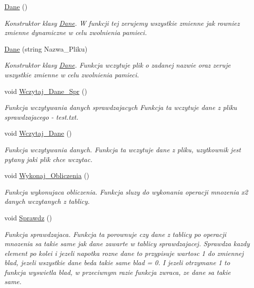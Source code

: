 \begin{DoxyCompactItemize}
\item 
\hyperlink{class_dane_a623e63e2c94f352a14758c8671f197d0}{\-Dane} ()
\begin{DoxyCompactList}\small\item\em \-Konstruktor klasy \hyperlink{class_dane}{\-Dane}. \-W funkcji tej zerujemy wszystkie zmienne jak rowniez zmienne dynamiczne w celu zwolnienia pamieci. \end{DoxyCompactList}\item 
\hyperlink{class_dane_ac5b1c1fcec846b36b7bd601e2358aef0}{\-Dane} (string \-Nazwa\-\_\-\-Pliku)
\begin{DoxyCompactList}\small\item\em \-Konstruktor klasy \hyperlink{class_dane}{\-Dane}. \-Funkcja wczytuje plik o zadanej nazwie oraz zeruje wszystkie zmienne w celu zwolnienia pamieci. \end{DoxyCompactList}\item 
void \hyperlink{class_dane_a83171250f88d38d2cbac97185b3bd5dd}{\-Wczytaj\-\_\-\-Dane\-\_\-\-Spr} ()
\begin{DoxyCompactList}\small\item\em \-Funkcja wczytywania danych sprawdzajacych \-Funkcja ta wczytuje dane z pliku sprawdzajacego -\/ test.\-txt. \end{DoxyCompactList}\item 
void \hyperlink{class_dane_ad992d9c799eb8e35bfb6069e0812b908}{\-Wczytaj\-\_\-\-Dane} ()
\begin{DoxyCompactList}\small\item\em \-Funkcja wczytywania danych. \-Funkcja ta wczytuje dane z pliku, uzytkownik jest pytany jaki plik chce wczytac. \end{DoxyCompactList}\item 
void \hyperlink{class_dane_a71e1e5ab35b8952f84724853c042e90b}{\-Wykonaj\-\_\-\-Obliczenia} ()
\begin{DoxyCompactList}\small\item\em \-Funkcja wykonujaca obliczenia. \-Funkcja sluzy do wykonania operacji mnozenia x2 danych wczytanych z tablicy. \end{DoxyCompactList}\item 
void \hyperlink{class_dane_a1dd37a4eb6da968da533e80f36145fdc}{\-Sprawdz} ()
\begin{DoxyCompactList}\small\item\em \-Funkcja sprawdzajaca. \-Funkcja ta porownuje czy dane z tablicy po operacji mnozenia sa takie same jak dane zawarte w tablicy sprawdzajacej. \-Sprawdza kazdy element po kolei i jezeli napotka rozne dane to przypisuje wartosc 1 do zmiennej blad, jezeli wszystkie dane beda takie same blad = 0. \-I jezeli otrzymane 1 to funkcja wyswietla blad, w przeciwnym razie funkcja zwraca, ze dane sa takie same. \end{DoxyCompactList}\item 

\end{DoxyCompactItemize}
